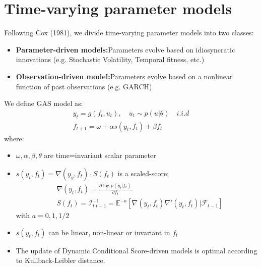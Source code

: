 \section{Time-varying parameter models}
Following Cox (1981), we divide time-varying parameter models into two classes:
\begin{itemize}
	\item \textbf{Parameter-driven models:}Parameters evolve based on idiosyncratic innovations (e.g. Stochastic Volatility, Temporal fitness, etc.)
	\item \textbf{Observation-driven model:}Parameters evolve based on a nonlinear function of past observations (e.g. GARCH)
\end{itemize}
\begin{mydefinition}
We define GAS model as:
\begin{align*}
	y_t = g(f_t,u_t), \quad u_t \sim p(u|\theta) \quad i.i.d\\
	f_{t+1} =\omega + \alpha s(y_t,f_t) + \beta f_t
\end{align*}
where:
\begin{itemize}
	\item $\omega, \alpha, \beta, \theta$ are time=invariant scalar parameter
	\item $s(y_t,f_t) = \nabla(y_y,f_t) \cdot S(f_t)$ is a scaled-score:
	\begin{align}
	& \nabla(y_t,f_t) = \frac{\partial \log p(y_t | f_t)}{\partial f_t}\\
	& S(f_t) = \mathcal{I}^{-1}_{t|t-1} = \mathbb{E}^{-a}[\nabla (y_t,f_t) \nabla'(y_t,f_t)|\mathcal{F}_{t-1}]
	\end{align}
with $a = 0,1,1/2$
    \item $s(y_t,f_t)$ can be linear, non-linear or invariant in $f_t$
    \item The update of Dynamic Conditional Score-driven models is optimal according to Kullback-Leibler distance.
\end{itemize}
\end{mydefinition}
